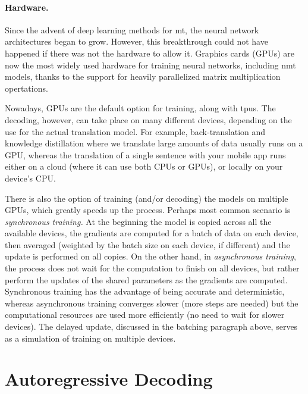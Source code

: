\paragraph{Hardware.} Since the advent of deep learning methods for \ac{mt},
the neural network architectures began to grow. However, this breakthrough
could not have happened if there was not the hardware to allow it. Graphics
cards (GPUs) are now the most widely used hardware for training neural
networks, including \ac{nmt} models, thanks to the support for heavily
parallelized matrix multiplication opertations.

Nowadays, GPUs are the default option for training, along with \acp{tpu}. The
decoding, however, can take place on many different devices, depending on the
use for the actual translation model. For example, back-translation and
knowledge distillation where we translate large amounts of data usually runs on
a GPU, whereas the translation of a single sentence with your mobile app runs
either on a cloud (where it can use both CPUs or GPUs), or locally on your
device's CPU.

There is also the option of training (and/or decoding) the models on multiple
GPUs, which greatly speeds up the process. Perhaps most common scenario is
\emph{synchronous training.} At the beginning the model is copied across all
the available devices, the gradients are computed for a batch of data on each
device, then averaged (weighted by the batch size on each device, if different)
and the update is performed on all copies. On the other hand, in
\emph{asynchronous training}, the process does not wait for the computation to
finish on all devices, but rather perform the updates of the shared parameters
as the gradients are computed. Synchronous training has the advantage of being
accurate and deterministic, whereas asynchronous training converges slower
(more steps are needed) but the computational resources are used more
efficiently (no need to wait for slower devices).  The delayed update,
discussed in the batching paragraph above, serves as a simulation of training
on multiple devices.

\section{Autoregressive Decoding}
\label{sec:decoding}

